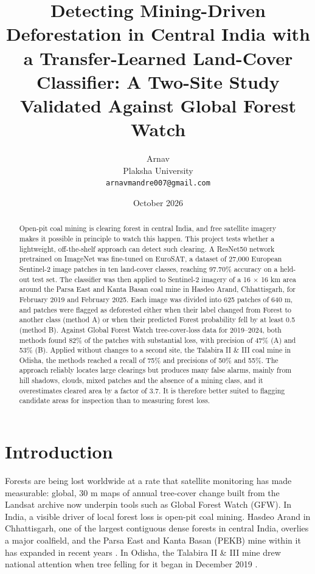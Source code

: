 \documentclass[11pt]{article}
\title{Detecting Mining-Driven Deforestation in Central India with a Transfer-Learned Land-Cover Classifier: A Two-Site Study Validated Against Global Forest Watch}
\author{Arnav \\ Plaksha University \\ \texttt{arnavmandre007@gmail.com}}
\date{October 2026}
\begin{document}
\maketitle

\begin{abstract}
Open-pit coal mining is clearing forest in central India, and free satellite imagery makes it possible in principle to watch this happen. This project tests whether a lightweight, off-the-shelf approach can detect such clearing. A ResNet50 network pretrained on ImageNet was fine-tuned on EuroSAT, a dataset of 27,000 European Sentinel-2 image patches in ten land-cover classes, reaching 97.70\% accuracy on a held-out test set. The classifier was then applied to Sentinel-2 imagery of a 16 $\times$ 16 km area around the Parsa East and Kanta Basan coal mine in Hasdeo Arand, Chhattisgarh, for February 2019 and February 2025. Each image was divided into 625 patches of 640 m, and patches were flagged as deforested either when their label changed from Forest to another class (method A) or when their predicted Forest probability fell by at least 0.5 (method B). Against Global Forest Watch tree-cover-loss data for 2019--2024, both methods found 82\% of the patches with substantial loss, with precision of 47\% (A) and 53\% (B). Applied without changes to a second site, the Talabira II \& III coal mine in Odisha, the methods reached a recall of 75\% and precisions of 50\% and 55\%. The approach reliably locates large clearings but produces many false alarms, mainly from hill shadows, clouds, mixed patches and the absence of a mining class, and it overestimates cleared area by a factor of 3.7. It is therefore better suited to flagging candidate areas for inspection than to measuring forest loss.
\end{abstract}

\section{Introduction}

Forests are being lost worldwide at a rate that satellite monitoring has made measurable: global, 30 m maps of annual tree-cover change built from the Landsat archive \citep{hansen2013} now underpin tools such as Global Forest Watch (GFW). In India, a visible driver of local forest loss is open-pit coal mining. Hasdeo Arand in Chhattisgarh, one of the largest contiguous dense forests in central India, overlies a major coalfield, and the Parsa East and Kanta Basan (PEKB) mine within it has expanded in recent years \citep{gem_pekb}. In Odisha, the Talabira II \& III mine drew national attention when tree felling for it began in December 2019 \citep{mongabay2019}.
\end{document}
